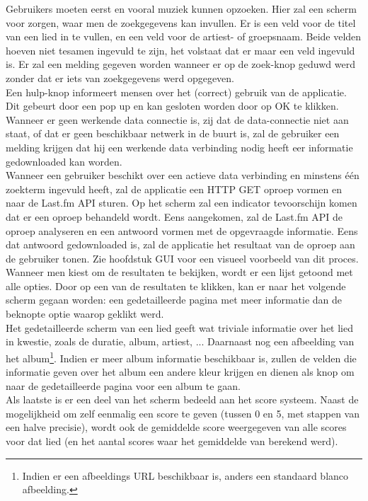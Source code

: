 \documentclass[11pt,a4paper]{article}
\begin{document}
Gebruikers moeten eerst en vooral muziek kunnen opzoeken. Hier zal een scherm voor zorgen, waar men de zoekgegevens kan invullen. Er is een veld voor de titel van een lied in te vullen, en een veld voor de artiest- of groepsnaam. Beide velden hoeven niet tesamen ingevuld te zijn, het volstaat dat er maar een veld ingevuld is. Er zal een melding gegeven worden wanneer er op de zoek-knop geduwd werd zonder dat er iets van zoekgegevens werd opgegeven.
\\ 

Een hulp-knop informeert mensen over het (correct) gebruik van de applicatie. Dit gebeurt door een pop up en kan gesloten worden door op OK te klikken. 
\\ 
 
Wanneer er geen werkende data connectie is, zij dat de data-connectie niet aan staat, of dat er geen beschikbaar netwerk in de buurt is, zal de gebruiker een melding krijgen dat hij een werkende data verbinding nodig heeft eer informatie gedownloaded kan worden. 
\\ 
	
Wanneer een gebruiker beschikt over een actieve data verbinding en minstens één zoekterm ingevuld heeft, zal de applicatie een HTTP GET oproep vormen en naar de Last.fm API sturen. Op het scherm zal een indicator tevoorschijn komen dat er een oproep behandeld wordt. Eens aangekomen, zal de Last.fm API de oproep analyseren en een antwoord vormen met de opgevraagde informatie. Eens dat antwoord gedownloaded is, zal de applicatie het resultaat van de oproep aan de gebruiker tonen. Zie hoofdstuk GUI voor een visueel voorbeeld van dit proces. 
\\ 
	
Wanneer men kiest om de resultaten te bekijken, wordt er een lijst getoond met alle opties. Door op een van de resultaten te klikken, kan er naar het volgende scherm gegaan worden: een gedetailleerde pagina met meer informatie  dan de beknopte optie waarop geklikt werd. 
\\ 
	
Het gedetailleerde scherm van een lied geeft wat triviale informatie over het lied in kwestie, zoals de duratie, album, artiest, ... Daarnaast nog een afbeelding van het album\footnote{Indien er een afbeeldings URL beschikbaar is, anders een standaard blanco afbeelding.}. Indien er meer album informatie beschikbaar is, zullen de velden die informatie geven over het album een andere kleur krijgen en dienen als knop om naar de gedetailleerde pagina voor een album te gaan. 
\\ 	
Als laatste is er een deel van het scherm bedeeld aan het score systeem. Naast de mogelijkheid om zelf eenmalig een score te geven (tussen 0 en 5, met stappen van een halve precisie), wordt ook de gemiddelde score weergegeven van alle scores voor dat lied (en het aantal scores waar het gemiddelde van berekend werd). 
\\ 
	
\end{document}
